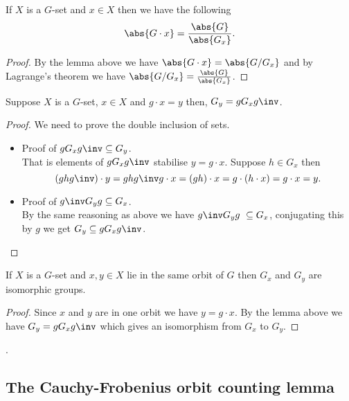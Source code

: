 \documentclass[12pt, a4paper]{article}
\begin{document}
\begin{mdcor}
    If \(X\) is a \(G\)-set and \(x \in X\) then we have the following
    \[\abs{G\cdot x}=\frac{\abs{G}}{\abs{G_x}}.\]
\end{mdcor}

\begin{proof}
    By the lemma above we have \(\abs{G\cdot x}=\abs{G/G_x}\) and by Lagrange's theorem we have \(\abs{G/G_x}=\frac{\abs{G}}{\abs{G_x}}\).
\end{proof}

\begin{lemma}
    Suppose \(X\) is a \(G\)-set, \(x\in X\) and \(g\cdot x=y\) then, \(G_y = gG_xg\inv\).
\end{lemma}

\begin{proof}
    We need to prove the double inclusion of sets.
    \begin{itemize}
        \item Proof of \(gG_x g\inv \subseteq G_y\). \\
        That is elements of \(gG_xg\inv\) stabilise \(y=g\cdot x\). Suppose \(h\in G_x\) then 
        \[(ghg\inv )\cdot y = ghg\inv g \cdot x = (gh)\cdot x = g \cdot (h\cdot x) = g\cdot x =y.\]
        \item Proof of \(g\inv G_y g \subseteq G_x\). \\
        By the same reasoning as above we have \(g\inv G_y g\ \subseteq G_x\), conjugating this by \(g\) we get \(G_y \subseteq gG_x g\inv\).
    \end{itemize}
\end{proof}

\begin{mdcor}
    If \(X\) is a \(G\)-set and \(x,y\in X\) lie in the same orbit of \(G\) then \(G_x\) and \(G_y\) are isomorphic groups.
\end{mdcor}

\begin{proof}
    Since \(x\) and \(y\) are in one orbit we have \(y=g\cdot x\). By the lemma above we have \(G_y =gG_x g\inv\) which gives an isomorphism from \(G_x\) to \(G_y\).
\end{proof}

.

\subsection{The Cauchy-Frobenius orbit counting lemma}
\end{document}
